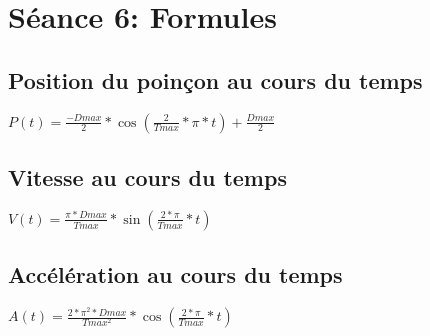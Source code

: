 \section{Séance 6: Formules}

\subsection{Position du poinçon au cours du temps}
$P(t) = \frac{-Dmax}{2}*\cos(\frac{2}{Tmax}*\pi*t)+\frac{Dmax}{2}$

\subsection{Vitesse au cours du temps}
$V(t) = \frac{\pi*Dmax}{Tmax}*\sin(\frac{2*\pi}{Tmax}*t)$

\subsection{Accélération au cours du temps}
$A(t) = \frac{2*\pi^2*Dmax}{Tmax^2}*\cos(\frac{2*\pi}{Tmax}*t)$
